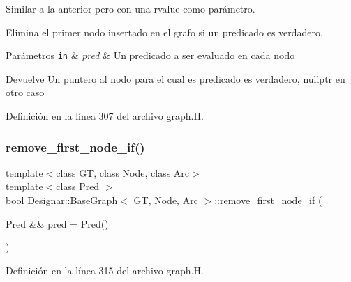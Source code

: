 Similar a la anterior pero con una rvalue como parámetro. 

Elimina el primer nodo insertado en el grafo si un predicado es verdadero.


\begin{DoxyParams}[1]{Parámetros}
\mbox{\tt in}  & {\em pred} & Un predicado a ser evaluado en cada nodo \\
\hline
\end{DoxyParams}
\begin{DoxyReturn}{Devuelve}
Un puntero al nodo para el cual es predicado es verdadero, {\ttfamily nullptr} en otro caso 
\end{DoxyReturn}


Definición en la línea 307 del archivo graph.\+H.

\mbox{\label{class_designar_1_1_base_graph_aec049416b5240910cb04b1d6f55fcecf}} 
\subsubsection{\texorpdfstring{remove\+\_\+first\+\_\+node\+\_\+if()}{remove\_first\_node\_if()}\hspace{0.1cm}{\footnotesize\ttfamily [2/2]}}
{\footnotesize\ttfamily template$<$class GT, class Node, class Arc$>$ \\
template$<$class Pred $>$ \\
bool \hyperlink{class_designar_1_1_base_graph}{Designar\+::\+Base\+Graph}$<$ \hyperlink{demo-buildgraph_8_c_a3001c40d2c31ca87ed96cd7d1334a55e}{GT}, \hyperlink{namespace_designar_a5af326c65aa2bd26b26c410f2030d09e}{Node}, \hyperlink{namespace_designar_a3f55fb5513d62ff47cbc8f72b8e95d6f}{Arc} $>$\+::remove\+\_\+first\+\_\+node\+\_\+if (\begin{DoxyParamCaption}\item[{Pred \&\&}]{pred = {\ttfamily Pred()} }\end{DoxyParamCaption})\hspace{0.3cm}{\ttfamily [inline]}}



Definición en la línea 315 del archivo graph.\+H.

\mbox{\label{class_designar_1_1_base_graph_aae56ca6b3b936835d07275f2ceb4b0d1}} 
